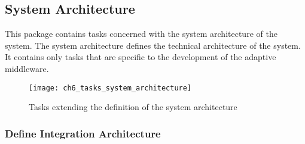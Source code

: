 \subsection{System Architecture}
This package contains tasks concerned with the system architecture of the system. The system architecture defines the technical architecture of the system. It contains only tasks that are specific to the development of the adaptive middleware.

\begin{figure}[htpb] \centering 
	\texttt{[image: ch6\_tasks\_system\_architecture]} 
	\caption{Tasks extending the definition of the system architecture} 
	\label{fig:ch6_tasks_system_architecture} 
\end{figure}

\subsubsection{Define Integration Architecture}
